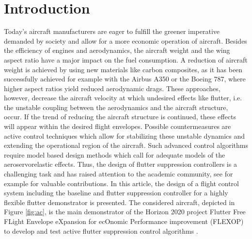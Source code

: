 \documentclass[aerospace,article,submit,moreauthors,pdftex,10pt,a4paper]{Definitions/mdpi}
\begin{document}


\section{Introduction}
Today's aircraft manufacturers are eager to fulfill the greener imperative demanded by society and allow for a more economic operation of aircraft. Besides the efficiency of engines and aerodynamics, the aircraft weight and the wing aspect ratio have a major impact on the fuel consumption. A reduction of aircraft weight is achieved by using new materials like carbon composites, as it has been successfully achieved for example with the Airbus A350 or the Boeing 787, where higher aspect ratios yield reduced aerodynamic drags. These  approaches, however, decrease the aircraft velocity at which undesired effects like flutter, i.e. the unstable coupling between the aerodynamics and the aircraft structure, occur. If the trend of reducing the aircraft structure is continued, these effects will appear within the desired flight envelopes.  Possible countermeasures are active control techniques which allow for stabilizing these unstable dynamics and extending the operational region of the aircraft. 
Such advanced control algorithms require model based design methods which call for adequate models of the aeroservorelastic effects. Thus, the design of flutter suppression controllers is a challenging task and has raised attention to the academic community, see for example \cite{Theis16,Danowsky17,Danowsky18} for valuable contributions. In this article, the design of a flight control system including the baseline and flutter suppression controller for a highly flexible flutter demonstrator is presented. The considered aircraft, depicted in Figure \ref{fig:ac}, is the main demonstrator of the Horizon 2020 project Flutter Free FLight Envelope eXpansion for ecOnomic Performance improvement (FLEXOP) to develop and test active flutter suppression control algorithms \cite{Stahl17,Roessler19}.
\end{document}
